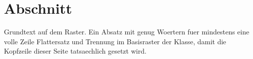 \documentclass{swisstex}
\begin{document}
\section{Abschnitt}
Grundtext auf dem Raster. Ein Absatz mit genug Woertern fuer mindestens
eine volle Zeile Flattersatz und Trennung im Basisraster der Klasse, damit
die Kopfzeile dieser Seite tatsaechlich gesetzt wird.
\end{document}
